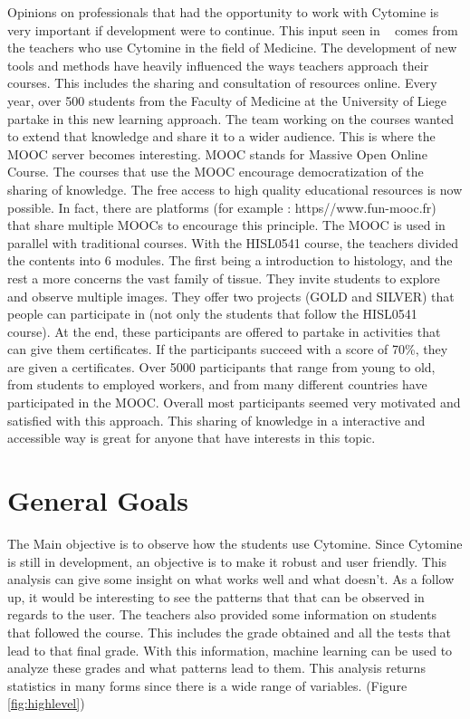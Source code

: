 \documentclass[a4paper,11pt]{report}
\numberwithin{figure}{section} %
\begin{document}
    Opinions on professionals that had the opportunity to work with Cytomine is very important if development were to continue.
    This input seen in ~\cite{hist} comes from the teachers who use Cytomine in the field of Medicine.
    The development of new tools and methods have heavily influenced the ways teachers approach their courses.
    This includes the sharing and consultation of resources online.
    Every year, over 500 students from the Faculty of Medicine at the University of Liege partake in this new learning approach.
    The team working on the courses wanted to extend that knowledge and share it to a wider audience.
    This is where the MOOC server becomes interesting.
    MOOC stands for Massive Open Online Course.
    The courses that use the MOOC encourage democratization of the sharing of knowledge.
    The free access to high quality educational resources is now possible.
    In fact, there are platforms (for example : https//www.fun-mooc.fr) that share multiple MOOCs to encourage this principle.
    The MOOC is used in parallel with traditional courses.
    With the HISL0541 course, the teachers divided the contents into 6 modules.
    The first being a introduction to histology, and the rest a more concerns the vast family of tissue.
    They invite students to explore and observe multiple images.
    They offer two projects (GOLD and SILVER) that people can participate in (not only the students that follow the HISL0541 course).
    At the end, these participants are offered to partake in activities that can give them certificates.
    If the participants succeed with a score of 70\%, they are given a certificates.
    Over 5000 participants that range from young to old, from students to employed workers, and from many different countries have participated in the MOOC.
    Overall most participants seemed very motivated and satisfied with this approach.
    This sharing of knowledge in a interactive and accessible way is great for anyone that have interests in this topic.


\section{General Goals}


    The Main objective is to observe how the students use Cytomine.
    Since Cytomine is still in development, an objective is to make it robust and user friendly.
    This analysis can give some insight on what works well and what doesn't.
    As a follow up, it would be interesting to see the patterns that that can be observed in regards to the user.
    The teachers also provided some information on students that followed the course.
    This includes the grade obtained and all the tests that lead to that final grade.
    With this information, machine learning can be used to analyze these grades and what patterns lead to them.
    This analysis returns statistics in many forms since there is a wide range of variables. (Figure \ref{fig:highlevel})
\end{document}
